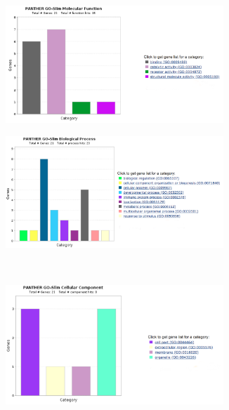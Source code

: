 \begin{figure}[H]
\label{adpdfigure}
\begin{subfigure}[b]{0.5\linewidth}
\centering
\includegraphics[width=0.9\textwidth]{./Figures/GO/adpd/adpd1}\par
\end{subfigure}
\begin{subfigure}[b]{0.5\linewidth}
\centering
\includegraphics[width=0.9\textwidth]{./Figures/GO/adpd/adpd2}\par
\end{subfigure}\\
\begin{subfigure}[b]{0.5\linewidth}
\centering
\includegraphics[width=0.9\textwidth]{./Figures/GO/adpd/adpd3}\par

\end{subfigure}
\end{figure}
